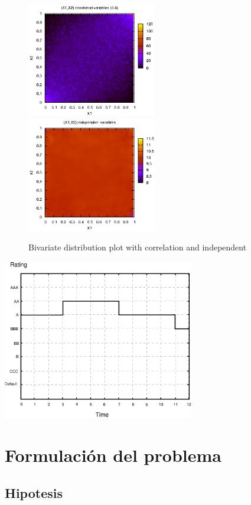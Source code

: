 \begin{figure}[!hb]
\begin{center}
\includegraphics[height=5cm, angle=0]{./images/copula.eps}
\includegraphics[height=5cm, angle=0]{./images/uniform.eps}
\caption{Bivariate distribution plot with correlation and independent}
\label{fig1}
\end{center}
\end{figure}

\includegraphics[height=7cm, angle=0]{./images/ratingevol.eps}

\chapter{Formulaci\'on del problema}
\label{sec:formulation}

\section{Hipotesis}

